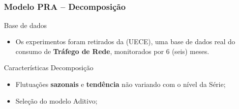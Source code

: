 \documentclass[aspectratio=169]{beamer}
\begin{document}
\subsection{}

\begin{frame}
\frametitle{Modelo PRA -- Decomposição}
    \begin{itemize}\small
    \end{itemize}
\begin{block}{Base de dados}
    \begin{itemize}
        \item Os experimentos foram retirados da (UECE), uma base de dados real do consumo de \textbf{Tráfego de Rede}, monitorados por 6 (seis) meses.
        \end{itemize}
\end{block}
\begin{block}{Características Decomposição}
    \begin{itemize}\small
    \item Flutuações \textbf{sazonais} e \textbf{tendência} não variando com o nível da Série;
    \item Seleção do modelo Aditivo;
    \end{itemize}
\end{block}%


\end{frame}
\end{document}
